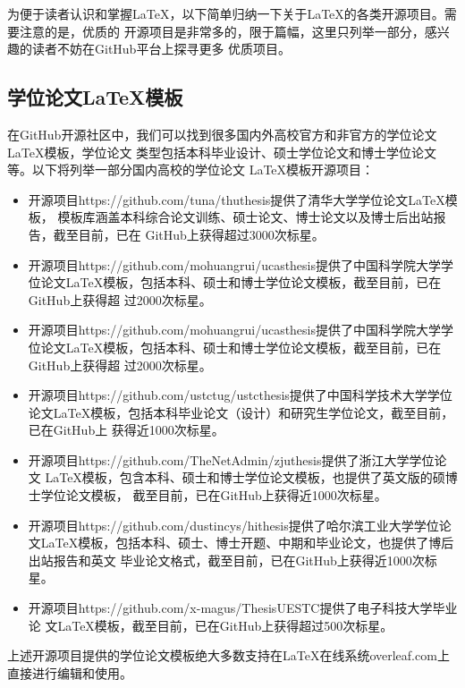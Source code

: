 为便于读者认识和掌握LaTeX，以下简单归纳一下关于LaTeX的各类开源项目。需要注意的是，优质的
开源项目是非常多的，限于篇幅，这里只列举一部分，感兴趣的读者不妨在GitHub平台上探寻更多
优质项目。

\subsection{学位论文\LaTeX 模板}
在GitHub开源社区中，我们可以找到很多国内外高校官方和非官方的学位论文LaTeX模板，学位论文
类型包括本科毕业设计、硕士学位论文和博士学位论文等。以下将列举一部分国内高校的学位论文
LaTeX模板开源项目：
\begin{itemize}
      \item 开源项目https://github.com/tuna/thuthesis提供了清华大学学位论文LaTeX模板，
            模板库涵盖本科综合论文训练、硕士论文、博士论文以及博士后出站报告，截至目前，已在
            GitHub上获得超过3000次标星。
      \item 开源项目https://github.com/mohuangrui/ucasthesis提供了中国科学院大学学
            位论文LaTeX模板，包括本科、硕士和博士学位论文模板，截至目前，已在GitHub上获得超
            过2000次标星。
      \item 开源项目https://github.com/mohuangrui/ucasthesis提供了中国科学院大学学
            位论文LaTeX模板，包括本科、硕士和博士学位论文模板，截至目前，已在GitHub上获得超
            过2000次标星。
      \item 开源项目https://github.com/ustctug/ustcthesis提供了中国科学技术大学学位
            论文LaTeX模板，包括本科毕业论文（设计）和研究生学位论文，截至目前，已在GitHub上
            获得近1000次标星。
      \item 开源项目https://github.com/TheNetAdmin/zjuthesis提供了浙江大学学位论文
            LaTeX模板，包含本科、硕士和博士学位论文模板，也提供了英文版的硕博士学位论文模板，
            截至目前，已在GitHub上获得近1000次标星。
      \item 开源项目https://github.com/dustincys/hithesis提供了哈尔滨工业大学学位论
            文LaTeX模板，包括本科、硕士、博士开题、中期和毕业论文，也提供了博后出站报告和英文
            毕业论文格式，截至目前，已在GitHub上获得近1000次标星。
      \item 开源项目https://github.com/x-magus/ThesisUESTC提供了电子科技大学毕业论
            文LaTeX模板，截至目前，已在GitHub上获得超过500次标星。
\end{itemize}

上述开源项目提供的学位论文模板绝大多数支持在LaTeX在线系统overleaf.com上直接进行编辑和使用。

